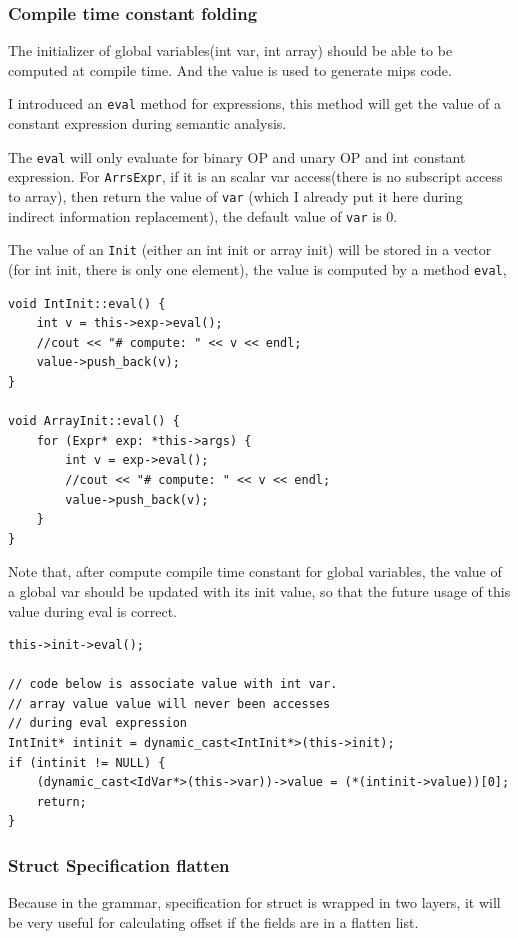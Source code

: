 \documentclass[11pt]{article}
\begin{document}
\subsubsection{Compile time constant folding}
\label{sec:orgheadline14}
The initializer of global variables(int var, int array) should be able to be
computed at compile time. And the value is used to generate mips code.

I introduced an \texttt{eval} method for expressions, this method will get the
value of a constant expression during semantic analysis.

The \texttt{eval} will only evaluate for binary OP and unary OP and int constant
expression. For \texttt{ArrsExpr}, if it is an scalar var access(there is no
subscript access to array), then return the value of \texttt{var} (which I already
put it here during indirect information replacement), the default value of
\texttt{var} is 0.

The value of an \texttt{Init} (either an int init or array init) will be stored in
a vector (for int init, there is only one element), the value is computed
by a method \texttt{eval},

\begin{verbatim}
void IntInit::eval() {
    int v = this->exp->eval();
    //cout << "# compute: " << v << endl;
    value->push_back(v);
}

void ArrayInit::eval() {
    for (Expr* exp: *this->args) {
        int v = exp->eval();
        //cout << "# compute: " << v << endl;
        value->push_back(v);
    }
}
\end{verbatim}

Note that, after compute compile time constant for global variables, the
value of a global var should be updated with its init value, so that the
future usage of this value during eval is  correct.

\begin{verbatim}
this->init->eval();

// code below is associate value with int var. 
// array value value will never been accesses
// during eval expression
IntInit* intinit = dynamic_cast<IntInit*>(this->init);
if (intinit != NULL) {
    (dynamic_cast<IdVar*>(this->var))->value = (*(intinit->value))[0];
    return;
}
\end{verbatim}
\subsubsection{Struct Specification flatten}
\label{sec:orgheadline15}
Because in the grammar, specification for struct is wrapped in two layers,
it will be very useful for calculating offset if the fields are in a flatten
list.
\end{document}
